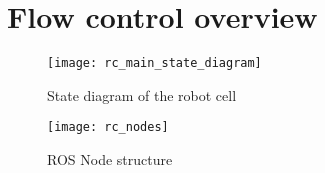 \section{Flow control overview}
\label{sec:rc_flow_control}
	\begin{figure}[H]
		\centering
	    \texttt{[image: rc\_main\_state\_diagram]}
	    \caption{State diagram of the robot cell}
		\label{fig:rc_main_state}
	\end{figure}
	
	\begin{figure}[H]
		\centering
	    \texttt{[image: rc\_nodes]}
	    \caption{ROS Node structure}
		\label{fig:rc_nodes}
	\end{figure}
	